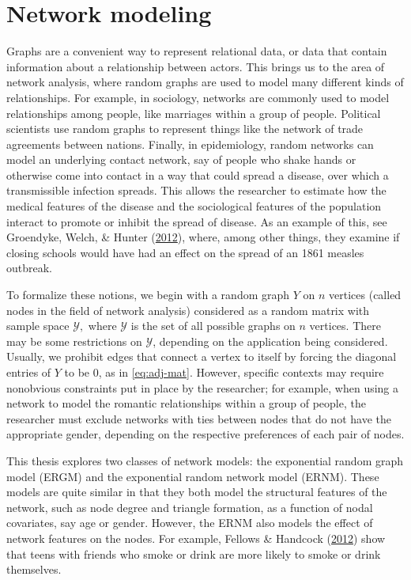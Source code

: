 \documentclass[12pt,twoside]{reedthesis}
\theoremstyle{definition}
\theoremstyle{definition}
\theoremstyle{remark}
\begin{document}
\section{Network modeling}\label{network-modeling}

Graphs are a convenient way to represent relational data, or data that
contain information about a relationship between actors. This brings us
to the area of network analysis, where random graphs are used to model
many different kinds of relationships. For example, in sociology,
networks are commonly used to model relationships among people, like
marriages within a group of people. Political scientists use random
graphs to represent things like the network of trade agreements between
nations. Finally, in epidemiology, random networks can model an
underlying contact network, say of people who shake hands or otherwise
come into contact in a way that could spread a disease, over which a
transmissible infection spreads. This allows the researcher to estimate
how the medical features of the disease and the sociological features of
the population interact to promote or inhibit the spread of disease. As
an example of this, see Groendyke, Welch, \& Hunter
(\protect\hyperlink{ref-Groendyke2012}{2012}), where, among other
things, they examine if closing schools would have had an effect on the
spread of an 1861 measles outbreak.

To formalize these notions, we begin with a random graph \(Y\) on \(n\)
vertices (called nodes in the field of network analysis) considered as a
random matrix with sample space \(\mathcal{Y},\) where \(\mathcal{Y}\)
is the set of all possible graphs on \(n\) vertices. There may be some
restrictions on \(\mathcal{Y}\), depending on the application being
considered. Usually, we prohibit edges that connect a vertex to itself
by forcing the diagonal entries of \(Y\) to be \(0\), as in
\eqref{eq:adj-mat}. However, specific contexts may require nonobvious
constraints put in place by the researcher; for example, when using a
network to model the romantic relationships within a group of people,
the researcher must exclude networks with ties between nodes that do not
have the appropriate gender, depending on the respective preferences of
each pair of nodes.

This thesis explores two classes of network models: the exponential
random graph model (ERGM) and the exponential random network model
(ERNM). These models are quite similar in that they both model the
structural features of the network, such as node degree and triangle
formation, as a function of nodal covariates, say age or gender.
However, the ERNM also models the effect of network features on the
nodes. For example, Fellows \& Handcock
(\protect\hyperlink{ref-Fellows2012}{2012}) show that teens with friends
who smoke or drink are more likely to smoke or drink themselves.
\end{document}
